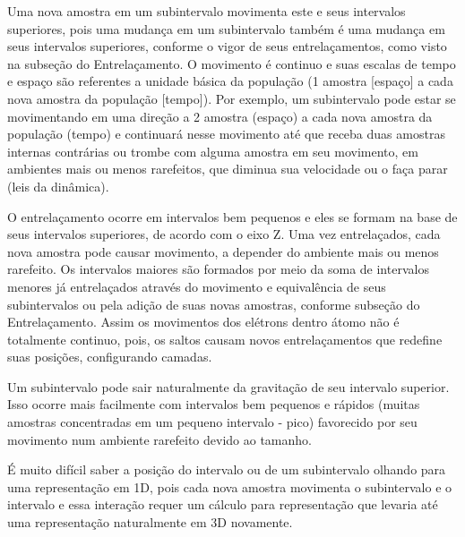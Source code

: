 Uma nova amostra em um subintervalo movimenta este e seus intervalos superiores, pois uma mudança em um subintervalo também é uma mudança em seus intervalos superiores, conforme o vigor de seus entrelaçamentos, como visto na subseção do Entrelaçamento. O movimento é continuo e suas escalas de tempo e espaço são referentes a unidade básica da população (1 amostra [espaço] a cada nova amostra da população [tempo]). Por exemplo, um subintervalo pode estar se movimentando em uma direção a 2 amostra (espaço) a cada nova amostra da população (tempo) e continuará nesse movimento até que receba duas amostras internas contrárias ou trombe com alguma amostra em seu movimento, em ambientes mais ou menos rarefeitos, que diminua sua velocidade ou o faça parar (leis da dinâmica). 

O entrelaçamento ocorre em intervalos bem pequenos e eles se formam na base de seus intervalos superiores, de acordo com o eixo Z. Uma vez entrelaçados, cada nova amostra pode causar movimento, a depender do ambiente mais ou menos rarefeito. Os intervalos maiores são formados por meio da soma de intervalos menores já entrelaçados através do movimento e equivalência de seus subintervalos ou pela adição de suas novas amostras, conforme subseção do Entrelaçamento. Assim os movimentos dos elétrons dentro átomo não é totalmente continuo, pois, os saltos causam novos entrelaçamentos que redefine suas posições, configurando camadas.

Um subintervalo pode sair naturalmente da gravitação de seu intervalo superior. Isso ocorre mais facilmente com intervalos bem pequenos e rápidos (muitas amostras concentradas em um pequeno intervalo - pico) favorecido por seu movimento num ambiente rarefeito devido ao tamanho. 

É muito difícil saber a posição do intervalo ou de um subintervalo olhando para uma representação em 1D, pois cada nova amostra movimenta o subintervalo e o intervalo e essa interação requer um cálculo para representação que levaria até uma representação naturalmente em 3D novamente.

